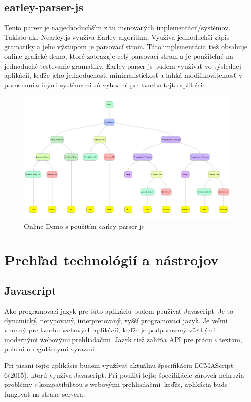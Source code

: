 \documentclass[12pt,a4paper]{report}
\theoremstyle{definition}
\theoremstyle{remark}
\begin{document}
\subsection{earley-parser-js}
Tento parser je najjednoduchším z tu menovaných implementácií/systémov. Takisto ako Nearley.js využíva Earley algorithm. Využíva jednoduchší zápis gramatiky a jeho výstupom je parsovací strom. Táto implementácia tiež obsahuje online grafické demo, ktoré zobrazuje celý parsovací strom a je použiteľné na jednoduché testovanie gramatiky. Earley-parser-js\cite{earley-oop} budem využívať vo výslednej aplikácii, keďže jeho jednoduchosť, minimalistickosť a ľahká modifikovateľnosť v porovnaní s inými systémami sú výhodné pre tvorbu tejto aplikácie.
\begin{figure}[H]
\includegraphics[scale=0.4]{onlineDemo}
\caption{Online Demo s použitím earley-parser-js}
\end{figure}

\section{Prehľad technológií a nástrojov}

\subsection{Javascript}
Ako programovací jazyk pre túto aplikáciu budem používať Javascript. Je to dynamický, netypovaný, interpretovaný, vyšší programovací jazyk. Je veľmi vhodný pre tvorbu webových aplikácií, keďže je podporovaný všetkými modernými webovými prehliadačmi. Jazyk tiež zahŕňa API pre prácu s textom, poľami a regulárnymi výrazmi.

Pri písaní tejto aplikácie budem využívať aktuálnu špecifikáciu ECMAScript 6(2015), ktorú využíva Javascript. Pri použití tejto špecifikácie zároveň nehrozia problémy s kompatibilitou s webovými prehliadačmi, keďže, aplikácia bude fungovať na strane servera.\cite{js}
\end{document}
